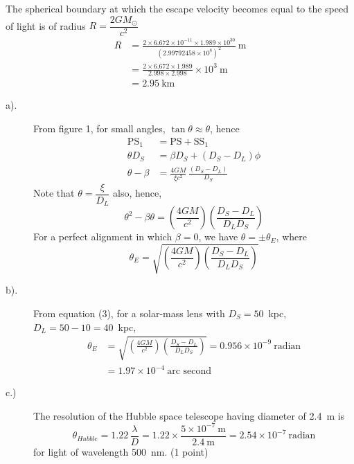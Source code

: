 The spherical boundary at which the escape velocity becomes equal to the speed
of light is of radius $R = \dfrac{2GM_\odot}{c^2}$
\begin{align*}
R &= \frac{2 \times 6.672 \times 10^{-11} \times 1.989 \times 10^{30}}
         {\left(2.99792458 \times 10^{8}\right)^2}~\mathrm{m}\\
  &= \frac{2 \times 6.672 \times 1.989}{2.998 \times 2.998} \times 10^{3}~\mathrm{m}\\
  &= 2.95~\mathrm{km}
\end{align*}

\begin{description}
\item[a).] From figure 1, for small angles, $\tan\theta \approx \theta$, hence
\begin{align*}
\mathrm{PS}_1 &= \mathrm{PS} + \mathrm{SS}_1\\
\theta D_S &= \beta D_S + \left(D_S - D_L\right)\phi\\
\theta - \beta &= \frac{4GM}{\xi c^2}\,\frac{\left(D_S - D_L\right)}{D_S}
  \tag*{(1)\quad(1 point)}
\end{align*}
Note that $\theta = \dfrac{\xi}{D_L}$ also, hence,
\[
\theta^2 - \beta\theta
  = \left(\frac{4GM}{c^2}\right)\left(\frac{D_S - D_L}{D_L D_S}\right)
  \tag*{(2)}
\]
For a perfect alignment in which $\beta = 0$, we have $\theta = \pm\theta_E$,
where
\[
\theta_E = \sqrt{\left(\frac{4GM}{c^2}\right)\left(\frac{D_S - D_L}{D_L D_S}\right)}
  \tag*{(3)\quad(1 point)}
\]

\item[b).] From equation (3), for a solar-mass lens with $D_S = 50$~kpc,
$D_L = 50 - 10 = 40$~kpc,
\begin{align*}
\theta_E &= \sqrt{\left(\frac{4GM}{c^2}\right)
                  \left(\frac{D_S - D_L}{D_L D_S}\right)}
          = 0.956 \times 10^{-9}~\text{radian}\\
         &= 1.97 \times 10^{-4}~\text{arc second} \tag*{(1 point)}
\end{align*}

\item[c.)] The resolution of the Hubble space telescope having diameter of
2.4~m is
\[
\theta_{Hubble} = 1.22\,\frac{\lambda}{D}
  = 1.22 \times \frac{5 \times 10^{-7}~\mathrm{m}}{2.4~\mathrm{m}}
  = 2.54 \times 10^{-7}~\text{radian}
\]
for light of wavelength 500~nm. \hfill(1 point)


\end{description}
